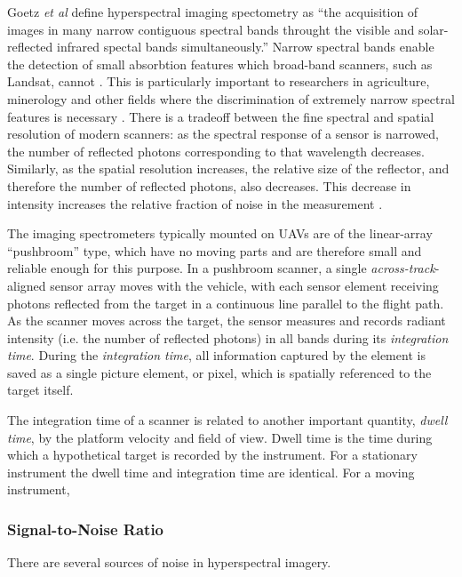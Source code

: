\documentclass[10pt]{article}
\begin{document}
Goetz \emph{et al} \cite{Goetz1985} define hyperspectral imaging spectometry as ``the acquisition of images in many narrow contiguous spectral bands throught the visible and solar-reflected infrared spectal bands simultaneously.'' Narrow spectral bands enable the detection of small absorbtion features which broad-band scanners, such as Landsat, cannot \cite{Goetz1985}. This is particularly important to researchers in agriculture, minerology and other fields where the discrimination of extremely narrow spectral features is necessary \cite{Goetz1985}. There is a tradeoff between the fine spectral and spatial resolution of modern scanners: as the spectral response of a sensor is narrowed, the number of reflected photons corresponding to that wavelength decreases. Similarly, as the spatial resolution increases, the relative size of the reflector, and therefore the number of reflected photons, also decreases. This decrease in intensity increases the relative fraction of noise in the measurement \cite{Moses2012}.

The imaging spectrometers typically mounted on UAVs are of the linear-array ``pushbroom'' type, which have no moving parts and are therefore small and reliable enough for this purpose. In a pushbroom scanner, a single \emph{across-track}-aligned sensor array moves with the vehicle, with each sensor element receiving photons reflected from the target in a continuous line parallel to the flight path. As the scanner moves across the target, the sensor measures and records radiant intensity (i.e. the number of reflected photons) in all bands during its \emph{integration time}. During the \emph{integration time}, all information captured by the element is saved as a single picture element, or pixel, which is spatially referenced to the target itself. 

The integration time of a scanner is related to another important quantity, \emph{dwell time}, by the platform velocity and field of view. Dwell time is the time during which a hypothetical target is recorded by the instrument. For a stationary instrument the dwell time and integration time are identical. For a moving instrument, 

\subsubsection{Signal-to-Noise Ratio}

There are several sources of noise in hyperspectral imagery. 
\end{document}
